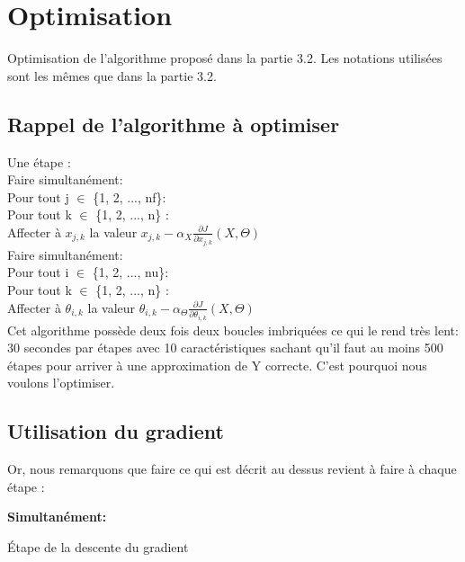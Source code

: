\documentclass[a4paper,10pt]{article}
\begin{document}
\newpage

\section{Optimisation}
\label{optimisation}

Optimisation de l'algorithme proposé dans la partie 3.2. Les notations utilisées sont les mêmes que dans la partie 3.2.

\subsection{Rappel de l'algorithme à optimiser}

\noindent Une \'{e}tape :\\
\indent Faire simultan\'{e}ment:\\
\indent \indent Pour tout j $\in$ \{1, 2, ..., nf\}:\\
\indent \indent \indent Pour tout k $\in$ \{1, 2, ..., n\} :\\
\indent \indent \indent \indent Affecter \`{a} $x_{j,k}$ la valeur $x_{j,k}-\alpha_X \frac{\partial J}{\partial x_{j,k}}(X, \Theta)$\\
\indent Faire simultan\'{e}ment:\\
\indent \indent Pour tout i $\in$ \{1, 2, ..., nu\}:\\
\indent \indent \indent Pour tout k $\in$ \{1, 2, ..., n\} :\\
\indent \indent \indent \indent Affecter \`{a} $\theta_{i,k}$ la valeur $\theta_{i,k}-\alpha_\Theta \frac{\partial J}{\partial \theta_{i,k}}(X, \Theta)$\\

\noindent Cet algorithme poss\`{e}de deux fois deux boucles imbriqu\'{e}es ce qui le rend tr\`es lent: 30 secondes par \'{e}tapes avec 10 caract\'{e}ristiques sachant qu'il faut au moins 500 \'{e}tapes pour arriver à une approximation de Y correcte. C'est pourquoi nous voulons l'optimiser.

\subsection{Utilisation du gradient}

Or, nous remarquons que faire ce qui est décrit au dessus revient à faire à chaque étape :

\begin{algorithm}
\BlankLine
\textbf{Simultanément:}\\
\indent {}
\indent {}
\caption{Étape de la descente du gradient}
\end{algorithm}
\end{document}
